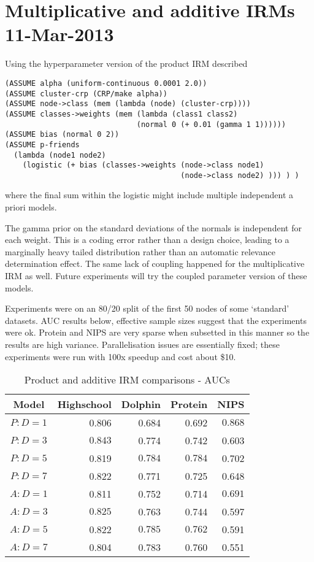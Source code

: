 \documentclass[twoside,11pt]{article}
\begin{document}
\section{Multiplicative and additive IRMs 11-Mar-2013}

Using the hyperparameter version of the product IRM described
%
\begin{lstlisting}[frame=single]
(ASSUME alpha (uniform-continuous 0.0001 2.0))
(ASSUME cluster-crp (CRP/make alpha))
(ASSUME node->class (mem (lambda (node) (cluster-crp))))
(ASSUME classes->weights (mem (lambda (class1 class2) 
                              (normal 0 (+ 0.01 (gamma 1 1))))))
(ASSUME bias (normal 0 2))
(ASSUME p-friends 
  (lambda (node1 node2) 
    (logistic (+ bias (classes->weights (node->class node1) 
                                        (node->class node2) ))) ) ) 
\end{lstlisting}
%
where the final sum within the logistic might include multiple independent a priori models.

{
\remark
The gamma prior on the standard deviations of the normals is independent for each weight.
This is a coding error rather than a design choice, leading to a marginally heavy tailed distribution rather than an automatic relevance determination effect.
The same lack of coupling happened for the multiplicative IRM as well.
Future experiments will try the coupled parameter version of these models.
}

Experiments were on an 80/20 split of the first 50 nodes of some `standard' datasets.
AUC results below, effective sample sizes suggest that the experiments were ok.
Protein and NIPS are very sparse when subsetted in this manner so the results are high variance.
Parallelisation issues are essentially fixed; these experiments were run with 100x speedup and cost about \$10.

\begin{table*}[ht!]
\caption{{\small
Product and additive IRM comparisons - AUCs
}}
\label{tbl:Prod Add IRM 11-Mar-2013}
\begin{center}
\begin{tabular}{c | r r r r}
Model & Highschool & Dolphin & Protein & NIPS \\
\hline
$P : D=1$ & 0.806 & 0.684 &  0.692 &  $\mathbf{0.868}$ \\
$P : D=3$ & $\mathbf{0.843}$ & 0.774 &  0.742 &  0.603 \\
$P : D=5$ & 0.819 & $\mathbf{0.784}$ &  $\mathbf{0.784}$ &  0.702 \\
$P : D=7$ & 0.822 & 0.771 &  0.725 &  0.648 \\
\hline
$A : D=1$ & 0.811 & 0.752 &  0.714 &  $\mathbf{0.691}$ \\
$A : D=3$ & $\mathbf{0.825}$ & 0.763 &  0.744 &  0.597 \\
$A : D=5$ & 0.822 & $\mathbf{0.785}$ &  $\mathbf{0.762}$ &  0.591 \\
$A : D=7$ & 0.804 & 0.783 &  0.760 &  0.551 \\
\end{tabular}
\end{center}
\end{table*}
\end{document}
